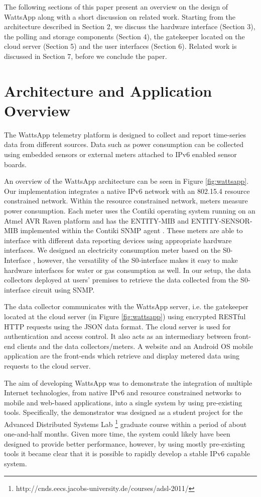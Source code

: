 \documentclass[10pt, conference, compsocconf]{IEEEtran}
\begin{document}
The following sections of this paper present an overview on the design
of WattsApp along with a short discussion on related work. Starting
from the architecture described in Section 2, we discuss the hardware
interface (Section 3), the polling and storage components (Section
4), the gatekeeper located on the cloud server (Section 5) and the
user interfaces (Section 6). Related work is discussed in Section
7, before we conclude the paper.


\section{Architecture and Application Overview}

The WattsApp telemetry platform is designed to collect and report
time-series data from different sources. Data such as power consumption
can be collected using embedded sensors or external meters attached
to IPv6 enabled sensor boards.

An overview of the WattsApp architecture can be seen in Figure \ref{fig:wattsapp}.
Our implementation integrates a native IPv6 network with an 802.15.4
resource constrained network. Within the resource constrained network,
meters measure power consumption. Each meter uses the Contiki operating
system \cite{contiki-2} running on an Atmel AVR Raven platform and
has the ENTITY-MIB \cite{rfc4133} and ENTITY-SENSOR-MIB \cite{rfc3433}
implemented within the Contiki SNMP agent \cite{aims-snmp-contiki}.
These meters are able to interface with different data reporting devices
using appropriate hardware interfaces. We designed an electricity
consumption meter based on the S0-Interface \cite{iec62053-31}, however,
the versatility of the S0-interface makes it easy to make hardware
interfaces for water or gas consumption as well. In our setup, the
data collectors deployed at users' premises to retrieve the data collected
from the S0-interface circuit using SNMP.

The data collector communicates with the WattsApp server, i.e. the
gatekeeper located at the cloud server (in Figure \ref{fig:wattsapp})
using encrypted RESTful HTTP requests using the JSON data format.
The cloud server is used for authentication and access control. It
also acts as an intermediary between front-end clients and the data
collectors/meters. A website and an Android OS mobile application
are the front-ends which retrieve and display metered data using requests
to the cloud server.

The aim of developing WattsApp was to demonstrate the integration
of multiple Internet technologies, from native IPv6 and resource constrained
networks to mobile and web-based applications, into a single system
by using pre-existing tools. Specifically, the demonstrator was designed
as a student project for the Advanced Distributed Systems Lab%
\footnote{http://cnds.eecs.jacobs-university.de/courses/adsl-2011/%
} graduate course within a period of about one-and-half months. Given
more time, the system could likely have been designed to provide better
performance, however, by using mostly pre-existing tools it became
clear that it is possible to rapidly develop a stable IPv6 capable
system.
\end{document}
